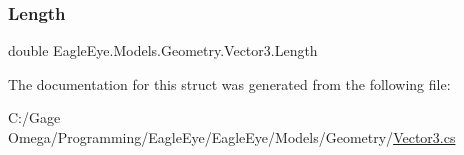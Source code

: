\subsubsection{\texorpdfstring{Length}{Length}}
{\footnotesize\ttfamily double Eagle\+Eye.\+Models.\+Geometry.\+Vector3.\+Length\hspace{0.3cm}{\ttfamily [get]}}



The documentation for this struct was generated from the following file\+:\begin{DoxyCompactItemize}
\item 
C\+:/\+Gage Omega/\+Programming/\+Eagle\+Eye/\+Eagle\+Eye/\+Models/\+Geometry/\mbox{\hyperlink{_vector3_8cs}{Vector3.\+cs}}\end{DoxyCompactItemize}
